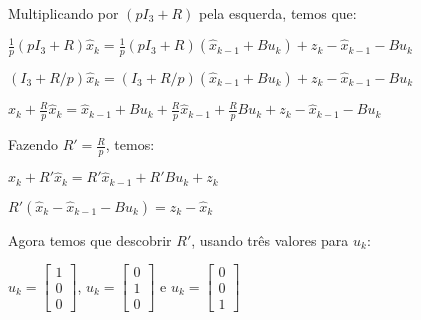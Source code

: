 \documentclass[12 pt]{article}
\begin{document}
Multiplicando por $(pI_{3}+R)$ pela esquerda, temos que:

\begin{center}
$\frac{1}{p}(pI_{3}+R)\hat{x}_{k} = \frac{1}{p}(pI_{3}+R)(\hat{x}_{k-1} + Bu_{k}) + z_{k} - \hat{x}_{k-1} - Bu_{k}$
\end{center}

\begin{center}
$(I_{3}+R/p)\hat{x}_{k} = (I_{3}+R/p)(\hat{x}_{k-1} + Bu_{k}) + z_{k} - \hat{x}_{k-1} - Bu_{k}$
\end{center}

\begin{center}
$\hat{x}_{k} + \frac{R}{p}\hat{x}_{k} = \hat{x}_{k-1} + Bu_{k} +\frac{R}{p}\hat{x}_{k-1} + \frac{R}{p}Bu_{k} + z_{k} - \hat{x}_{k-1} - Bu_{k}$
\end{center}

Fazendo $R' = \frac{R}{p}$, temos:

\begin{center}
$\hat{x}_{k} + R'\hat{x}_{k} = R'\hat{x}_{k-1} + R'Bu_{k} + z_{k}$
\end{center}


\begin{center}
$R'(\hat{x}_{k} - \hat{x}_{k-1} - Bu_{k})= z_{k} - \hat{x}_{k}$
\end{center}

Agora temos que descobrir $R'$, usando três valores para $u_{k}$:

\begin{center}
$u_{k} = \begin{bmatrix}
       1           \\[0.3em]
       0\\[0.3em]
       0 
     \end{bmatrix}$, 
$u_{k} = \begin{bmatrix}
       0           \\[0.3em]
       1\\[0.3em]
       0 
     \end{bmatrix}$ e
$u_{k} = \begin{bmatrix}
       0           \\[0.3em]
       0\\[0.3em]
       1 
     \end{bmatrix}$
\end{center}


\end{document}
